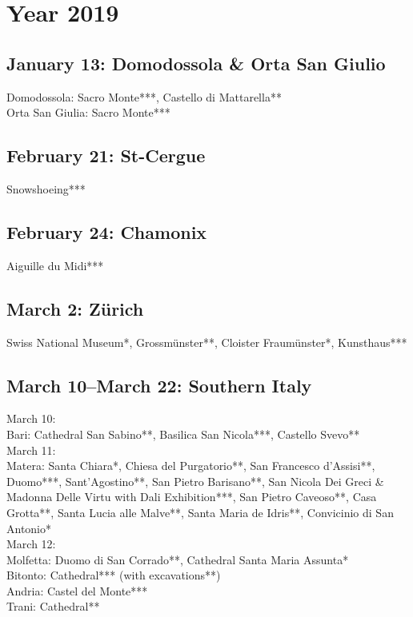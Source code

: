 \chapter{Year 2019}
\label{2019}

\section{January 13: Domodossola \& Orta San Giulio}
\label{2019:Domodossola}

Domodossola: Sacro Monte***, Castello di Mattarella**\\
Orta San Giulia: Sacro Monte***

\section{February 21: St-Cergue}
\label{StCergue2019}

Snowshoeing***

\section{February 24: Chamonix}
\label{Chamonix2019}

Aiguille du Midi***

\section{March 2: Z\"urich}
\label{Zurich2019}

Swiss National Museum*, Grossm\"unster**, Cloister Fraum\"unster*, Kunsthaus***

\section{March 10--March 22: Southern Italy}
\label{SouthItaly2019}

March 10:\\
Bari: Cathedral San Sabino**, Basilica San Nicola***,  Castello Svevo**\\

March 11:\\
Matera: Santa Chiara*, Chiesa del Purgatorio**, San Francesco d'Assisi**, Duomo***, Sant'Agostino**, San Pietro Barisano**, San Nicola Dei Greci \& Madonna Delle Virtu with Dali Exhibition***, San Pietro Caveoso**, Casa Grotta**, Santa Lucia alle Malve**, Santa Maria de Idris**, Convicinio di San Antonio*\\

March 12:\\
Molfetta: Duomo di San Corrado**, Cathedral Santa Maria Assunta*\\
Bitonto: Cathedral*** (with excavations**)\\
Andria: Castel del Monte***\\
Trani: Cathedral**\\

